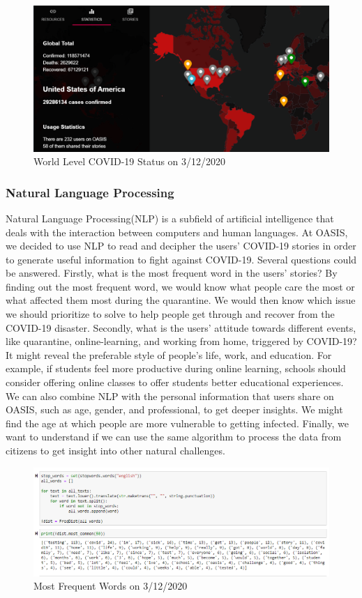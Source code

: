 \documentclass{ucsdreport}
\begin{document}
\begin{figure}[H]
    \centering
    \includegraphics[scale=0.5]{images/world.png}
    \caption{World Level COVID-19 Status on 3/12/2020}
\end{figure}

\subsubsection{Natural Language Processing}
Natural Language Processing(NLP) is a subfield of artificial intelligence 
that deals with the interaction between computers and human languages. At 
OASIS, we decided to use NLP to read and decipher the users’ COVID-19 stories 
in order to generate useful information to fight against COVID-19. Several 
questions could be answered. Firstly, what is the most frequent word in the 
users’ stories? By finding out the most frequent word, we would know what 
people care the most or what affected them most during the quarantine. 
We would then know which issue we should prioritize to solve to help people 
get through and recover from the COVID-19 disaster. Secondly, what is the 
users’ attitude towards different events, like quarantine, online-learning,
and working from home, triggered by COVID-19? It might reveal the preferable
style of people’s life, work, and education. For example, if students feel
more productive during online learning, schools should consider offering
online classes to offer students better educational experiences. We can also
combine NLP with the personal information that users share on OASIS, such as 
age, gender, and professional, to get deeper insights. We might find the age
at which people are more vulnerable to getting infected. Finally, we want to
understand if we can use the same algorithm to process the data from citizens
to get insight into other natural challenges.

\begin{figure}[H]
    \centering
    \includegraphics[scale=0.62]{images/nlp.png}
    \caption{Most Frequent Words on 3/12/2020}
\end{figure}
\end{document}
